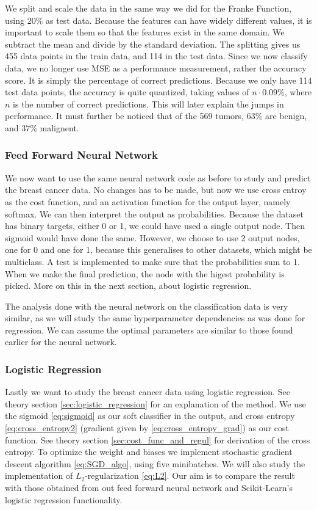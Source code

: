 \documentclass[12pt]{extarticle}
\begin{document}
We split and scale the data in the same way we did for the Franke Function, using $20\%$ as test data. Because the features can have widely different values, it is important to scale them so that the features exist in the same domain. We subtract the mean and divide by the standard deviation. The splitting gives us 455 data points in the train data, and 114 in the test data. Since we now classify data, we no longer use MSE as a performance measurement, rather the accuracy score. It is simply the percentage of correct predictions. Because we only have 114 test data points, the accuracy is quite quantized, taking values of $n\cdot 0.09\%$, where $n$ is the number of correct predictions. This will later explain the jumps in performance. It must further be noticed that of the 569 tumors, $63\%$ are benign, and $37\%$ malignent.

\subsubsection{Feed Forward Neural Network}
We now want to use the same neural network code as before to study and predict the breast cancer data. No changes has to be made, but now we use cross entroy as the cost function, and an activation function for the output layer, namely softmax. We can then interpret the output as probabilities. Because the dataset has binary targets, either 0 or 1, we could have used a single output node. Then sigmoid would have done the same. However, we choose to use 2 output nodes, one for 0 and one for 1, because this generalises to other datasets, which might be multiclass. A test is implemented to make sure that the probabilities sum to 1. When we make the final prediction, the node with the higest probability is picked. More on this in the next section, about logistic regression.


The analysis done with the neural network on the classification data is very similar, as we will study the same hyperparameter dependencies as was done for regression. We can assume the optimal parameters are similar to those found earlier for the neural network.



\subsubsection{Logistic Regression}
Lastly we want to study the breast cancer data using logistic regression. See theory section \ref{sec:logistic_regression} for an explanation of the method. We use the sigmoid \eqref{eq:sigmoid} as our soft classifier in the output, and cross entropy \eqref{eq:cross_entropy2} (gradient given by \eqref{eq:cross_entropy_grad}) as our cost function. See theory section \ref{sec:cost_func_and_regul} for derivation of the cross entropy. To optimize the weight and biases we implement stochastic gradient descent algorithm \eqref{eq:SGD_algo}, using five minibatches. We will also study the implementation of $L_2$-regularization \eqref{eq:L2}. Our aim is to compare the result with those obtained from out feed forward neural network and Scikit-Learn's logistic regression functionality.
\end{document}
